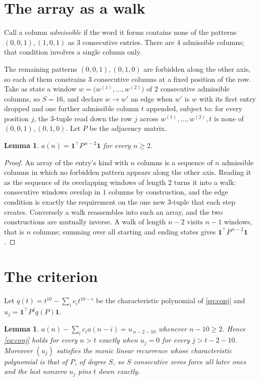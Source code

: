 \documentclass[11pt,a4paper]{article}
\theoremstyle{plain}
\newtheorem{lemma}[theorem]{Lemma}
\theoremstyle{definition}
\begin{document}
\section{The array as a walk}

Call a column \emph{admissible} if the word it forms contains none of the patterns
$(0,0,1), (1,0,1)$ as $3$ consecutive entries. There are $4$ admissible columns; that condition
involves a single column only.

The remaining patterns $(0,0,1), (0,1,0)$ are forbidden along the other axis, so each of them
constrains $3$ consecutive columns at a fixed position of the row. Take as state a
window $w=\bigl(w^{(1)},\dots,w^{(2)}\bigr)$ of $2$ consecutive admissible
columns, so $S=16$, and declare $w\to w'$ an edge when $w'$ is $w$ with its first entry
dropped and one further admissible column $t$ appended, subject to: for every position
$j$, the $3$-tuple read down the row $j$ across $w^{(1)},\dots,w^{(2)},t$
is none of $(0,0,1), (0,1,0)$. Let $P$ be the adjacency matrix.

\begin{lemma}\label{lem:walk}
$a(n)=\mathbf{1}^{\!\top}P^{\,n-2}\mathbf{1}$ for every $n\ge2$.
\end{lemma}

\begin{proof}
An array of the entry's kind with $n$ columns is a sequence of $n$ admissible columns in
which no forbidden pattern appears along the other axis. Reading it as the sequence of its
overlapping windows of length $2$ turns it into a walk: consecutive windows overlap in
$1$ columns by construction, and the edge condition is exactly the requirement on the one
new $3$-tuple that each step creates. Conversely a walk reassembles into such an array,
and the two constructions are mutually inverse. A walk of length $n-2$ visits $n-1$
windows, that is $n$ columns; summing over all starting and ending states gives
$\mathbf{1}^{\!\top}P^{\,n-2}\mathbf{1}$.
\end{proof}

\section{The criterion}

Let $q(t)=t^{10}-\sum_i c_i t^{10-i}$ be the characteristic polynomial of
\eqref{eq:conj} and $u_j=\mathbf{1}^{\!\top}P^{j}q(P)\mathbf{1}$.

\begin{lemma}\label{lem:crit}
$a(n)-\sum_i c_i a(n-i)=u_{\,n-2-10}$ whenever $n-10\ge2$. Hence
\eqref{eq:conj} holds for every $n>t$ exactly when $u_j=0$ for every
$j>t-2-10$. Moreover $(u_j)$ satisfies the monic linear recurrence whose
characteristic polynomial is that of $P$, of degree $S$, so $S$ consecutive zeros force all
later ones and the last nonzero $u_j$ pins $t$ down exactly.
\end{lemma}
\end{document}
